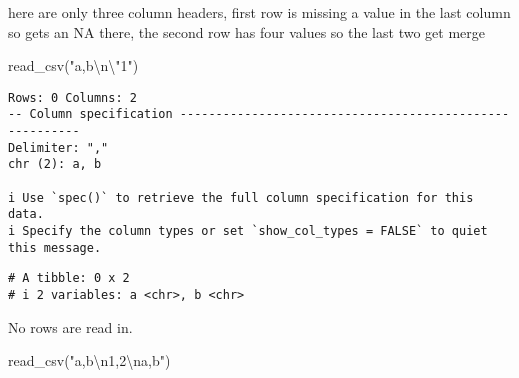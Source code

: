 \documentclass[
  letterpaper,
  DIV=11,
  numbers=noendperiod]{scrreprt}
\newenvironment{Shaded}{\begin{snugshade}}{\end{snugshade}}
\newcommand{\FunctionTok}[1]{\textcolor[rgb]{0.28,0.35,0.67}{#1}}
\newcommand{\NormalTok}[1]{\textcolor[rgb]{0.00,0.23,0.31}{#1}}
\newcommand{\SpecialCharTok}[1]{\textcolor[rgb]{0.37,0.37,0.37}{#1}}
\newcommand{\StringTok}[1]{\textcolor[rgb]{0.13,0.47,0.30}{#1}}
\begin{document}
\begin{enumerate}
\begin{tcolorbox}
  here are only three column headers, first row is missing a value in
  the last column so gets an NA there, the second row has four values so
  the last two get merge

  \end{tcolorbox}

  \begin{tcolorbox}[enhanced jigsaw, breakable, bottomtitle=1mm, left=2mm, colback=white, toprule=.15mm, leftrule=.75mm, colframe=quarto-callout-note-color-frame, colbacktitle=quarto-callout-note-color!10!white, title={Answer}, coltitle=black, toptitle=1mm, bottomrule=.15mm, opacitybacktitle=0.6, arc=.35mm, rightrule=.15mm, titlerule=0mm, opacityback=0]

\begin{Shaded}
\begin{Highlighting}[]
\FunctionTok{read\_csv}\NormalTok{(}\StringTok{"a,b}\SpecialCharTok{\textbackslash{}n\textbackslash{}"}\StringTok{1"}\NormalTok{)}
\end{Highlighting}
\end{Shaded}

\begin{verbatim}
Rows: 0 Columns: 2
-- Column specification --------------------------------------------------------
Delimiter: ","
chr (2): a, b

i Use `spec()` to retrieve the full column specification for this data.
i Specify the column types or set `show_col_types = FALSE` to quiet this message.
\end{verbatim}

\begin{verbatim}
# A tibble: 0 x 2
# i 2 variables: a <chr>, b <chr>
\end{verbatim}

  No rows are read in.

  \end{tcolorbox}

  \begin{tcolorbox}[enhanced jigsaw, breakable, bottomtitle=1mm, left=2mm, colback=white, toprule=.15mm, leftrule=.75mm, colframe=quarto-callout-note-color-frame, colbacktitle=quarto-callout-note-color!10!white, title={Answer}, coltitle=black, toptitle=1mm, bottomrule=.15mm, opacitybacktitle=0.6, arc=.35mm, rightrule=.15mm, titlerule=0mm, opacityback=0]

\begin{Shaded}
\begin{Highlighting}[]
\FunctionTok{read\_csv}\NormalTok{(}\StringTok{"a,b}\SpecialCharTok{\textbackslash{}n}\StringTok{1,2}\SpecialCharTok{\textbackslash{}n}\StringTok{a,b"}\NormalTok{)}
\end{Highlighting}
\end{Shaded}


\end{tcolorbox}
\end{enumerate}
\end{document}
